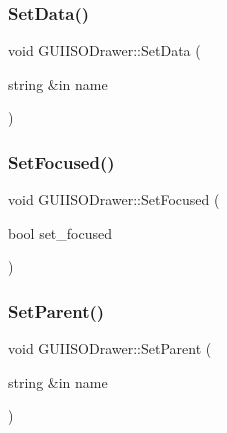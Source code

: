 \hypertarget{class_g_u_i_i_s_o_drawer_a58b6d885f773441479bdee31b1ed3238}{}\label{class_g_u_i_i_s_o_drawer_a58b6d885f773441479bdee31b1ed3238} 
\subsubsection{\texorpdfstring{Set\+Data()}{SetData()}}
{\footnotesize\ttfamily void G\+U\+I\+I\+S\+O\+Drawer\+::\+Set\+Data (\begin{DoxyParamCaption}\item[{string \&in}]{name }\end{DoxyParamCaption})}

\hypertarget{class_g_u_i_i_s_o_drawer_a844c0a199d99cc57b53731e3ccac7a76}{}\label{class_g_u_i_i_s_o_drawer_a844c0a199d99cc57b53731e3ccac7a76} 
\subsubsection{\texorpdfstring{Set\+Focused()}{SetFocused()}}
{\footnotesize\ttfamily void G\+U\+I\+I\+S\+O\+Drawer\+::\+Set\+Focused (\begin{DoxyParamCaption}\item[{bool}]{set\+\_\+focused }\end{DoxyParamCaption})}

\hypertarget{class_g_u_i_i_s_o_drawer_ace49c53f2f9e3d4f38cb9ef96e012992}{}\label{class_g_u_i_i_s_o_drawer_ace49c53f2f9e3d4f38cb9ef96e012992} 
\subsubsection{\texorpdfstring{Set\+Parent()}{SetParent()}}
{\footnotesize\ttfamily void G\+U\+I\+I\+S\+O\+Drawer\+::\+Set\+Parent (\begin{DoxyParamCaption}\item[{string \&in}]{name }\end{DoxyParamCaption})}

\hypertarget{class_g_u_i_i_s_o_drawer_a537901044fe44a57db328a7dfb0079b2}{}\label{class_g_u_i_i_s_o_drawer_a537901044fe44a57db328a7dfb0079b2} 
